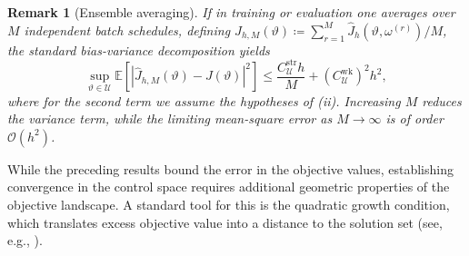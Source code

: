\documentclass[twoside,11pt]{article}
\theoremstyle{plain}
\newtheorem{remark}[theorem]{Remark}
\def\to{\rightarrow}
\begin{document}
\begin{remark}[Ensemble averaging]\label{rem:ensemble}
If in training or evaluation one averages over $M$ independent batch schedules, defining $\hat J_{h,M}(\vartheta) \coloneqq \sum_{r=1}^M \hat J_h(\vartheta,\omega^{(r)})/M$, the standard bias-variance decomposition yields
\begin{equation*}
\sup_{\vartheta\in\mathcal U} \mathbb E\left[ |\hat J_{h,M}(\vartheta)-J(\vartheta)|^2 \right] \le \frac{C_{\mathcal U}^{\mathrm{str}}h}{M} + (C_{\mathcal U}^{\mathrm{wk}})^2 h^2,
\end{equation*}
where for the second term we assume the hypotheses of (ii). Increasing $M$ reduces the variance term, while the limiting mean-square error as $M\to\infty$ is of order $\mathcal{O}(h^2)$.
\end{remark}

While the preceding results bound the error in the objective values, establishing convergence in the control space requires additional geometric properties of the objective landscape. A standard tool for this is the quadratic growth condition, which translates excess objective value into a distance to the solution set (see, e.g., \cite{DrusvyatskiyLewis2018}).
\end{document}

